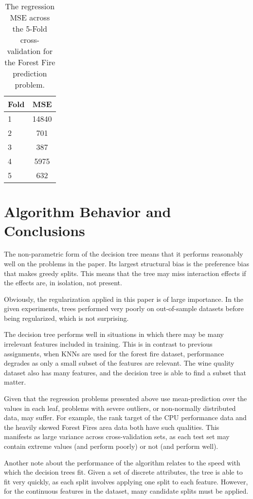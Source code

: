 \documentclass{amsart}
\begin{document}
   \begin{table}[H]
    \begin{tabular}{lc}
        Fold & MSE \\
        \hline
        1 & 14840 \\
        2 & 701 \\
        3 & 387 \\
        4 & 5975 \\
        5 & 632
    \end{tabular}
    \label{forest_fire_results}
    \caption{The regression MSE  across the 5-Fold cross-validation for the
    Forest Fire prediction problem.}
    \end{table}

    \section{Algorithm Behavior and Conclusions}
    The non-parametric form of the decision tree means that it performs reasonably
    well on the problems in the paper. Its largest structural bias is the preference
    bias that makes greedy splits. This means that the tree may miss interaction
    effects if the effects are, in isolation, not present.

    Obviously, the regularization applied in this paper is of large importance.
    In the given experiments, trees performed very poorly on out-of-sample
    datasets before being regularized, which is not surprising.

    The decision tree performs well in situations in which there may be many
    irrelevant features included in training. This is in contrast to previous assignments,
    when KNNs are used for the forest fire dataset, performance degrades as only a
    small subset of the features are relevant. The wine quality dataset also
    has many features, and the decision tree is able to find a subset that matter.

    Given that the regression problems presented above use mean-prediction
    over the values in each leaf, problems with severe outliers, or non-normally
    distributed data, may suffer. For example, the rank target of the
    CPU performance data and the heavily skewed
    Forest Fires area data both have such qualities. This manifests as
    large variance across cross-validation sets, as each test set may contain
    extreme values (and perform poorly) or not (and perform well).

    Another note about the performance of the algorithm relates to the speed
    with which the decision trees fit. Given a set of discrete attributes, the
    tree is able to fit very quickly, as each split involves
    applying one split to each feature. However, for the continuous features
    in the dataset, many candidate splits must be applied.
\end{document}
